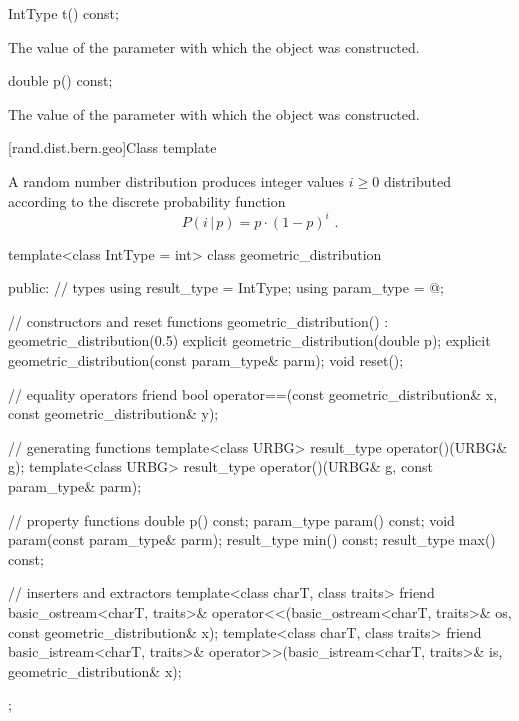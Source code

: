 %
\begin{itemdecl}
IntType t() const;
\end{itemdecl}%
\begin{itemdescr}
\pnum
\returns
The value of the  parameter
 with which the object was constructed.
\end{itemdescr}

%
\begin{itemdecl}
double p() const;
\end{itemdecl}

\begin{itemdescr}
\pnum
\returns
The value of the  parameter
 with which the object was constructed.
\end{itemdescr}


[rand.dist.bern.geo]{Class template }
%

\pnum
A  random number distribution
produces integer values $i \geq 0$
distributed according to
the discrete probability function
\[ P(i\,|\,p) = p \cdot (1-p)^{i} \text{ .} \]

%
%
\begin{codeblock}
template<class IntType = int>
  class geometric_distribution {
  public:
    // types
    using result_type = IntType;
    using param_type  = @\unspec@;

    // constructors and reset functions
    geometric_distribution() : geometric_distribution(0.5) {}
    explicit geometric_distribution(double p);
    explicit geometric_distribution(const param_type& parm);
    void reset();

    // equality operators
    friend bool operator==(const geometric_distribution& x, const geometric_distribution& y);

    // generating functions
    template<class URBG>
      result_type operator()(URBG& g);
    template<class URBG>
      result_type operator()(URBG& g, const param_type& parm);

    // property functions
    double p() const;
    param_type param() const;
    void param(const param_type& parm);
    result_type min() const;
    result_type max() const;

    // inserters and extractors
    template<class charT, class traits>
      friend basic_ostream<charT, traits>&
        operator<<(basic_ostream<charT, traits>& os, const geometric_distribution& x);
    template<class charT, class traits>
      friend basic_istream<charT, traits>&
        operator>>(basic_istream<charT, traits>& is, geometric_distribution& x);
  };
\end{codeblock}


